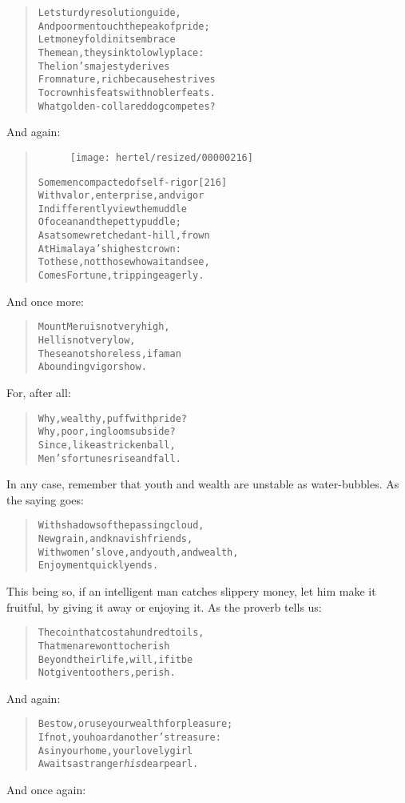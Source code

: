 \documentclass[article, twoside, 10pt]{memoir}
\renewenvironment{verbatim}{%
\begin{quote}%
\vskip -10pt%
\begin{alltt}\normalfont\small}{\end{alltt}%
\end{quote}%
\vskip -10pt
} %
\begin{document}
\begin{verbatim}
Let sturdy resolution guide,
And poor men touch the peak of pride;
Let money fold in its embrace
The mean, they sink to lowly place:
The lion's majesty derives
From nature, rich because he strives
To crown his feats with nobler feats.
What golden-collared dog competes?
\end{verbatim}
And again:

\begin{verbatim}
\begin{figure}[p]\texttt{[image: hertel/resized/00000216]}\end{figure}Some men compacted of self-rigor                        [216]
With valor, enterprise, and vigor
Indifferently view the muddle
Of ocean and the petty puddle;
As at some wretched ant-hill, frown
At Himalaya's highest crown:
To these, not those who wait and see,
Comes Fortune, tripping eagerly.
\end{verbatim}
And once more:

\begin{verbatim}
Mount Meru is not very high,
    Hell is not very low,
The sea not shoreless, if a man
    Abounding vigor show.
\end{verbatim}
For, after all:

\begin{verbatim}
Why, wealthy, puff with pride?
Why, poor, in gloom subside?
Since, like a stricken ball,
Men's fortunes rise and fall.
\end{verbatim}
In any case, remember that youth and wealth are unstable as
water-bubbles. As the saying goes:

\begin{verbatim}
With shadows of the passing cloud,
    New grain, and knavish friends,
With women's love, and youth, and wealth,
    Enjoyment quickly ends.
\end{verbatim}
This being so, if an intelligent man catches slippery money, let
him make it fruitful, by giving it away or enjoying it. As the
proverb tells us:

\begin{verbatim}
The coin that cost a hundred toils,
    That men are wont to cherish
Beyond their life, will, if it be
    Not given to others, perish.
\end{verbatim}
And again:

\begin{verbatim}
Bestow, or use your wealth for pleasure;
If not, you hoard another's treasure:
As in your home, your lovely girl
Awaits a stranger{\textemdash}\emph{his} dear pearl.
\end{verbatim}
And once again:
\end{document}
